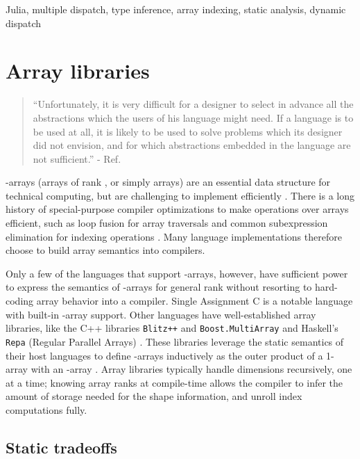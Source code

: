 \documentclass[preprint]{sigplanconf}
\newcommand{\code}[1]{\texttt{#1}}
\begin{document}
\keywords
Julia, multiple dispatch, type inference, array indexing, static analysis,
dynamic dispatch

\section{Array libraries}

\begin{quotation}
``Unfortunately, it is very difficult for a designer to select in advance all
the abstractions which the users of his language might need. If a language is
to be used at all, it is likely to be used to solve problems which its
designer did not envision, and for which abstractions embedded in the language
are not sufficient.'' - Ref. \cite{Liskov:1974pb}
\end{quotation}

-arrays (arrays of rank , or simply arrays) are an essential data
structure for technical computing, but are challenging to implement
efficiently \cite{Sattley:1960as,Sattley:1961as,Randell:1964a6}. There is a
long history of special-purpose compiler optimizations to make operations over
arrays efficient, such as loop fusion for array traversals and common
subexpression elimination for indexing operations \cite{Randell:1964a6,
Busam:1969oe}. Many language implementations therefore choose to build array
semantics into compilers.

Only a few of the languages that support -arrays, however, have sufficient
power to express the semantics of -arrays for general rank  without
resorting to hard-coding array behavior into a compiler.
Single Assignment C \cite{Grelck:2006sa} is a notable language with built-in
-array support. Other languages
have well-established array libraries, like the C++ libraries 
\code{Blitz++} \cite{Veldhuizen:1998ab} and \code{Boost.MultiArray}
\cite{Garcia:2005ma} and Haskell's \code{Repa} (Regular Parallel Arrays)
\cite{Keller:2010rs,Lippmeier:2011ep, Lippmeier:2012gp}. These libraries
leverage the static semantics of their host languages to
define -arrays inductively as the outer product of a 1-array with an
-array \cite{Bavestrelli:2000ct}.
Array libraries typically handle dimensions recursively, one at a time;
knowing array ranks at compile-time allows the compiler to infer the amount
of storage needed for the shape information, and unroll index computations fully.



\subsection{Static tradeoffs}
\end{document}
